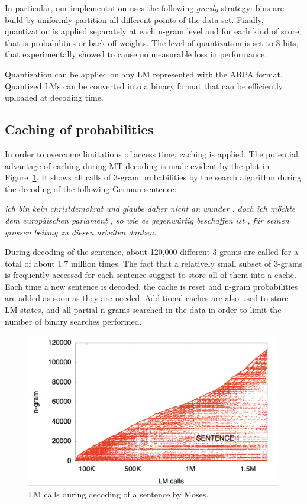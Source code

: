\documentclass[10pt]{report}
\theoremstyle{plain}
\begin{document}
{In particular, our implementation uses the following {\em greedy} strategy: bins are
build by uniformly partition all different points of the data set.  Finally, quantization is 
applied separately at each n-gram level and for each kind of score, that is probabilities
or back-off weights.  The level of quantization is set to 8 bits, that experimentally showed 
to cause  no measurable loss in performance.

Quantization can be applied on any LM represented with the ARPA format. Quantized LMs
can be converted into a binary format that can be efficiently uploaded at decoding time.


\subsection{Caching of probabilities}

In order to overcome limitations of access time, caching is applied. The potential advantage
of caching during MT decoding is made evident by the plot in Figure~\ref{fig:LM-calls}. 
It shows all calls of 3-gram probabilities by the search algorithm during the decoding of
the following German sentence:

{\em ich bin kein christdemokrat und glaube daher nicht an wunder . doch ich m\"ochte dem europ\"aischen parlament , so wie es gegenw\"urtig beschaffen ist , f\"ur seinen grossen beitrag zu diesen arbeiten danken.}

During decoding of the sentence, about 120,000 different 3-grams are called for a total 
of about  1.7 million times.  The fact that a relatively small subset of 3-grams is frequently
accessed for each sentence suggest to store all of them into a cache. Each time a new 
sentence is decoded, the cache is reset and n-gram probabilities are added as soon as they are 
needed.  Additional caches are also used to store LM states, and all partial  n-grams 
searched in the data in order to limit the number of binary searches performed.

\begin{figure}
\begin{center}
 \includegraphics[width=\columnwidth]{marcello-lmcalls}
\caption{LM calls during decoding of a sentence by Moses.}
\label{fig:LM-calls}
\end{center}
 \end{figure}

}
\end{document}
